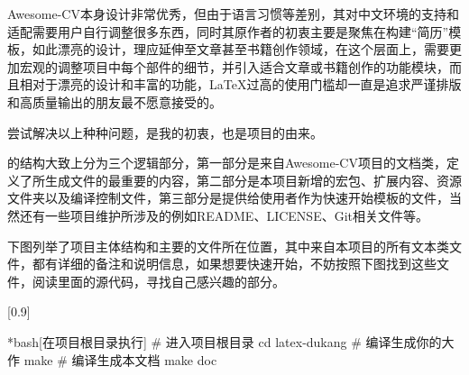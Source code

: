 Awesome-CV本身设计非常优秀，但由于语言习惯等差别，其对中文环境的支持和适配需要用户自行调整很多东西，同时其原作者的初衷主要是聚焦在构建“简历”模板，如此漂亮的设计，理应延伸至文章甚至书籍创作领域，在这个层面上，需要更加宏观的调整项目中每个部件的细节，并引入适合文章或书籍创作的功能模块，而且相对于漂亮的设计和丰富的功能，{\LaTeX}过高的使用门槛却一直是追求严谨排版和高质量输出的朋友最不愿意接受的。

尝试解决以上种种问题，是我的初衷，也是{\dk}项目的由来。

{\dk}的结构大致上分为三个逻辑部分，第一部分是来自Awesome-CV项目的文档类，定义了所生成文件的最重要的内容，第二部分是本项目新增的宏包、扩展内容、资源文件夹以及编译控制文件，第三部分是提供给使用者作为快速开始模板的文件，当然还有一些项目维护所涉及的例如README、LICENSE、Git相关文件等。

下图列举了项目主体结构和主要的文件所在位置，其中来自本项目的所有文本类文件，都有详细的备注和说明信息，如果想要{\color{awesome}快速开始}，不妨按照下图找到这些文件，阅读里面的源代码，寻找自己感兴趣的部分。

[0.9]


\begin{dkcode}*{bash}[在{\dk}项目根目录执行]
# 进入项目根目录
cd latex-dukang
# 编译生成你的大作
make
# 编译生成本文档
make doc
\end{dkcode}


\clearpage

